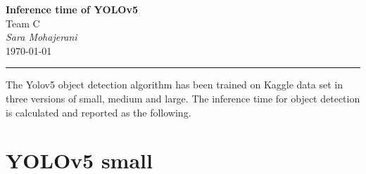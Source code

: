 \documentclass[12pt,a4paper]{article}
\begin{document}
\textcolor{UM_Brown}{
\begin{minipage}{0.8\textwidth}
    \begin{center}
        \textbf{\Large Inference time of YOLOv5}\\
        \vspace{5pt}
        Team C \\
        \vspace{20pt}
        \textit{Sara Mohajerani} \\
        \vspace{5pt}
        \today
    \end{center}
\end{minipage}
\vspace{10pt}
\hrule
\vspace{10pt}
}



The Yolov5 object detection algorithm has been trained on Kaggle data set in three versions of small, medium and large. The inference time for object detection is calculated and reported as the following.
\section*{YOLOv5 small}
\end{document}
